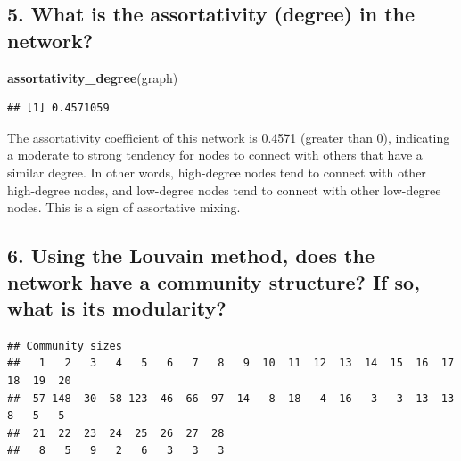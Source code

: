 \documentclass[
]{article}
\newenvironment{Shaded}{\begin{snugshade}}{\end{snugshade}}
\newcommand{\AttributeTok}[1]{\textcolor[rgb]{0.13,0.29,0.53}{#1}}
\newcommand{\FunctionTok}[1]{\textcolor[rgb]{0.13,0.29,0.53}{\textbf{#1}}}
\newcommand{\NormalTok}[1]{#1}
\newcommand{\OtherTok}[1]{\textcolor[rgb]{0.56,0.35,0.01}{#1}}
\newcommand{\SpecialCharTok}[1]{\textcolor[rgb]{0.81,0.36,0.00}{\textbf{#1}}}
\begin{document}
\subsection{5. What is the assortativity (degree) in the
network?}\label{what-is-the-assortativity-degree-in-the-network}

\begin{Shaded}
\begin{Highlighting}[]
\FunctionTok{assortativity\_degree}\NormalTok{(graph)}
\end{Highlighting}
\end{Shaded}

\begin{verbatim}
## [1] 0.4571059
\end{verbatim}

The assortativity coefficient of this network is 0.4571 (greater than
0), indicating a moderate to strong tendency for nodes to connect with
others that have a similar degree. In other words, high-degree nodes
tend to connect with other high-degree nodes, and low-degree nodes tend
to connect with other low-degree nodes. This is a sign of assortative
mixing.

\subsection{6. Using the Louvain method, does the network have a
community structure? If so, what is its
modularity?}\label{using-the-louvain-method-does-the-network-have-a-community-structure-if-so-what-is-its-modularity}

\begin{Shaded}
\end{Shaded}

\begin{verbatim}
## Community sizes
##   1   2   3   4   5   6   7   8   9  10  11  12  13  14  15  16  17  18  19  20 
##  57 148  30  58 123  46  66  97  14   8  18   4  16   3   3  13  13   8   5   5 
##  21  22  23  24  25  26  27  28 
##   8   5   9   2   6   3   3   3
\end{verbatim}
\end{document}
